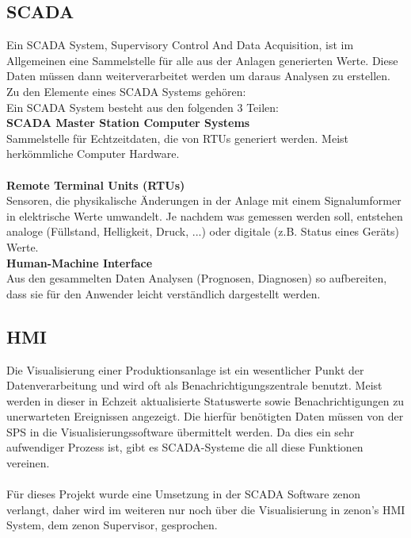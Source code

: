 \subsection{SCADA}
Ein SCADA System, Supervisory Control And Data Acquisition, ist im Allgemeinen eine Sammelstelle für alle aus der Anlagen generierten Werte. Diese Daten müssen dann weiterverarbeitet werden um daraus Analysen zu erstellen.\\
Zu den Elemente eines SCADA Systems gehören:\\
Ein SCADA System besteht aus den folgenden 3 Teilen:
\\
\textbf{SCADA Master Station Computer Systems}\\
Sammelstelle für Echtzeitdaten, die von RTUs generiert werden. Meist herkömmliche Computer Hardware.\\ 
\\
\textbf{Remote Terminal Units (RTUs)}\\
Sensoren, die physikalische Änderungen in der Anlage mit einem Signalumformer in elektrische Werte umwandelt. Je nachdem was gemessen werden soll, entstehen analoge (Füllstand, Helligkeit, Druck, ...) oder digitale (z.B. Status eines Geräts) Werte.
\\
\textbf{Human-Machine Interface}\\
Aus den gesammelten Daten Analysen (Prognosen, Diagnosen) so aufbereiten, dass sie für den Anwender leicht verständlich dargestellt werden.\\ 

\subsection{HMI}
Die Visualisierung einer Produktionsanlage ist ein wesentlicher Punkt der Datenverarbeitung und wird oft als Benachrichtigungszentrale benutzt. Meist werden in dieser in Echzeit aktualisierte Statuswerte sowie Benachrichtigungen zu unerwarteten Ereignissen angezeigt. Die hierfür benötigten Daten müssen von der SPS in die Visualisierungssoftware übermittelt werden. Da dies ein sehr aufwendiger Prozess ist, gibt es SCADA-Systeme die all diese Funktionen vereinen.\\
\\
Für dieses Projekt wurde eine Umsetzung in der SCADA Software zenon verlangt, daher wird im weiteren nur noch über die Visualisierung in zenon's HMI System, dem zenon Supervisor, gesprochen.\\
\\


